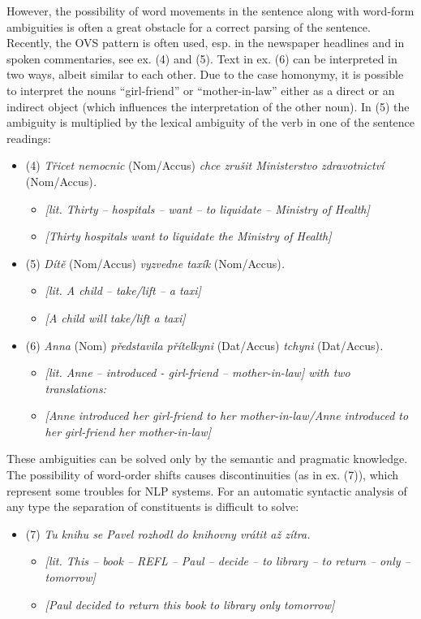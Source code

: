 \documentclass[]{../../metanetpaper}
\begin{document}
\begin{multicols}{2}
However, the possibility of word movements in the sentence along with word-form ambiguities is often a great obstacle for a correct parsing of the sentence. Recently, the OVS pattern is often used, esp. in the newspaper headlines and in spoken commentaries, see ex. (4) and (5). Text in ex. (6) can be interpreted in two ways, albeit similar to each other. Due to the case homonymy, it is possible to interpret the nouns “girl-friend” or “mother-in-law” either as a direct or an indirect object (which influences the interpretation of the other noun). In (5) the ambiguity is multiplied by the lexical ambiguity of the verb in one of the sentence readings:\cite{Note4_en}
\begin{itemize}	
\item[] (4)	\textit{Třicet nemocnic} (Nom/Accus) \textit{chce zrušit Ministerstvo zdravotnictví} (Nom/Accus)\textit{.}
\begin{itemize}	
	\item[] \textit{{[}lit. Thirty – hospitals – want – to liquidate – Ministry of Health{]}}
	\item[] \textit{{[}Thirty hospitals want to liquidate the Ministry of Health{]}}
\end{itemize}
 \item[](5)	\textit{Dítě} (Nom/Accus) \textit{vyzvedne taxík} (Nom/Accus)\textit{.}
\begin{itemize}	
	\item[] \textit{{[}lit. A child – take/lift – a taxi{]}}
	\item[] \textit{{[}A child will take/lift a taxi{]}}
\end{itemize}
 \item[](6)	\textit{Anna} (Nom) \textit{představila přítelkyni} (Dat/Accus) \textit{tchyni} (Dat/Accus)\textit{.}
\begin{itemize}	
	\item[] \textit{{[}lit. Anne – introduced -  girl-friend –  mother-in-law{]} with two translations:}
	\item[] \textit{{[}Anne introduced her girl-friend to her mother-in-law/Anne introduced to her girl-friend her mother-in-law{]}}
\end{itemize}
\end{itemize}

These ambiguities can be solved only by the semantic and pragmatic knowledge.
The possibility of word-order shifts causes discontinuities (as in ex. (7)), which represent some troubles for NLP systems. For an automatic syntactic analysis of any type the separation of constituents is difficult to solve:
\begin{itemize}
 \item[] (7)	\textit{Tu knihu se Pavel rozhodl do knihovny vrátit až zítra.}
\begin{itemize}	
	\item[] \textit{{[}lit. This – book – REFL – Paul – decide – to library – to return – only – tomorrow{]}}
	\item[] \textit{{[}Paul decided to return this book to library only tomorrow{]}}
\end{itemize}
\end{itemize}

\end{multicols}
\end{document}
